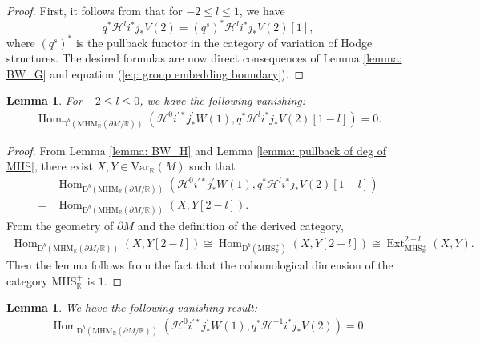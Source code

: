 \documentclass[11pt, a4paper]{amsart}
\theoremstyle{plain}
\newtheorem{lemma}[theorem]{Lemma}
\theoremstyle{definition}
\numberwithin{equation}{section}
\def\RR{\mathbb{R}}
\DeclareMathOperator{\Hom}{Hom}
\DeclareMathOperator{\Ext}{Ext}
\begin{document}
\begin{proof}
    First,  it follows from \cite[Proposition 2.3.12]{Bl06} that for $-2 \le l \le 1$, we have 
    \begin{equation*}
        q^{*} \mathcal{H}^{l}i^{*}j_{*}V(2) = (q^{s})^{*} \mathcal{H}^{l}i^{*}j_{*}V(2)[1], 
    \end{equation*}
    where $(q^{s})^{*}$ is the pullback functor in the category of variation of Hodge structures. The desired formulas are now
    direct consequences of Lemma \ref{lemma: BW_G} and equation (\ref{eq: group embedding boundary}).
\end{proof}

\begin{lemma}
\label{Lemma: Hom = 0 by cohomology degree}
    For $-2 \le l \le 0$, we have the following vanishing: 
    \begin{align*}
        \Hom_{\mathrm{D}^{b}(\mathrm{MHM}_{\RR}(\partial M/\RR))}(\mathcal{H}^{0}i^{\prime*}j_{*}^{\prime}W(1), q^{*}\mathcal{H}^{l}i^{*}j_{*}V(2)[1-l]) = 0.  
    \end{align*}
\end{lemma}

\begin{proof}
    From Lemma \ref{lemma: BW_H} and Lemma \ref{lemma: pullback of deg of MHS}, there exist $X, Y \in \mathrm{Var}_{\RR}(M)$ such that 
    \begin{align*}
        & \Hom_{\mathrm{D}^{b}(\mathrm{MHM}_{\RR}(\partial M/\RR))}(\mathcal{H}^{0}i^{\prime*}j_{*}^{\prime}W(1), q^{*}\mathcal{H}^{l}i^{*}j_{*}V(2)[1-l]) \\
        = & \Hom_{\mathrm{D}^{b}(\mathrm{MHM}_{\RR}(\partial M/\RR))}(X, Y[2-l]). 
    \end{align*}
    From the geometry of $\partial M$ and the definition of the derived category, 
    \begin{align*}
        \Hom_{\mathrm{D}^{b}(\mathrm{MHM}_{\RR}(\partial M/\RR))}(X, Y[2-l]) 
    \cong \Hom_{\mathrm{D}^{b}(\mathrm{MHS}_{\RR}^{+})}(X, Y[2-l]) 
    \cong \Ext^{2-l}_{\mathrm{MHS_{\RR}^{+}}}(X, Y). 
    \end{align*}
    Then the lemma follows from the fact that the cohomological dimension of the category $\mathrm{MHS_{\RR}^{+}}$ is $1$. 
\end{proof}

\begin{lemma}
\label{Lemma: Hom = 0 by Hodge type}
We have the following vanishing result: 
\begin{align*}
    \Hom_{\mathrm{D}^{b}(\mathrm{MHM}_{\RR}(\partial M / \RR))}(\mathcal{H}^{0}i^{\prime*}j_{*}^{\prime}W(1), q^{*}\mathcal{H}^{-1}i^{*}j_{*}V(2)) = 0. 
\end{align*}
\end{lemma}
\end{document}
